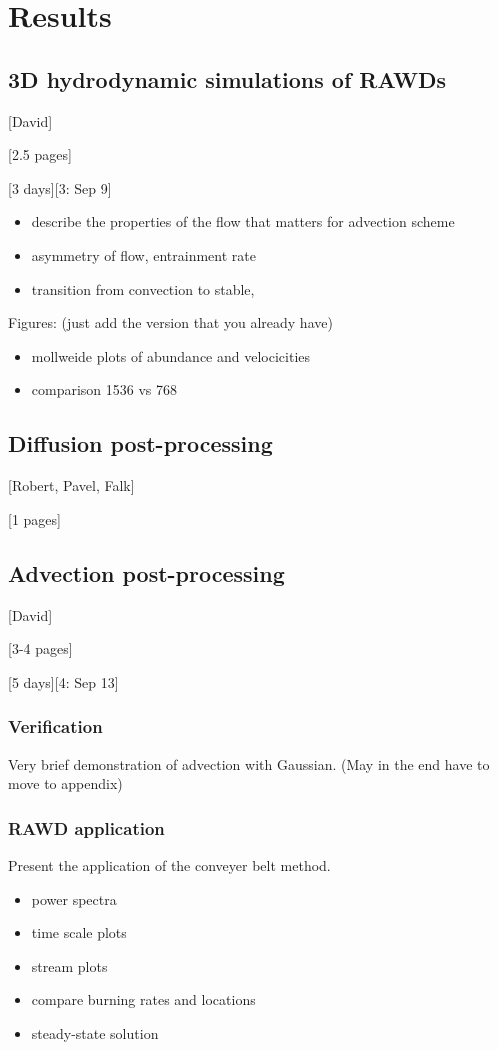 \documentclass[fleqn,usenatbib]{mnras}
\begin{document}
\section{Results}
\subsection{3D hydrodynamic simulations of RAWDs}

[David]

[2.5 pages]

[3 days][3: Sep 9]

\begin{itemize}
\item describe the properties of the flow that matters for advection scheme
\item asymmetry of flow, entrainment rate
\item transition from convection to stable, 
\end{itemize}


Figures: (just add the version that you already have)
\begin{itemize}
\item mollweide plots of abundance and velocicities
\item comparison 1536 vs 768
\end{itemize}


\subsection{Diffusion  post-processing}

[Robert, Pavel, Falk]

[1 pages]

\subsection{Advection post-processing}

[David]

[3-4 pages]

[5 days][4: Sep 13]

\subsubsection{Verification}
Very brief demonstration of advection with Gaussian. (May in the end have to move to appendix)

\subsubsection{RAWD application}
Present the application of the conveyer belt method.
\begin{itemize}
\item power spectra
\item time scale plots
\item stream plots
\item compare burning rates and locations
\item steady-state solution
\end{itemize}
\end{document}
